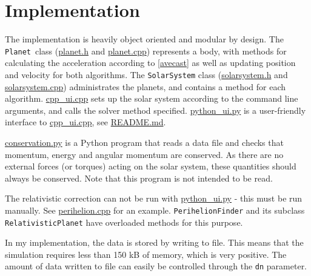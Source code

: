 \documentclass[12pt,english,a4paper]{article}
\newcommand{\program}[1]{\href{https://github.com/anjohan/Offentlig/blob/master/FYS3150/Oblig3/#1}{#1}}
\begin{document}
\section{Implementation}
The implementation is heavily object oriented and modular by design. The \texttt{Planet} class (\program{planet.h} and \program{planet.cpp}) represents a body, with methods for calculating the acceleration according to \ref{avecast} as well as updating position and velocity for both algorithms. The \texttt{SolarSystem} class (\program{solarsystem.h} and \program{solarsystem.cpp}) administrates the planets, and contains a method for each algorithm. \program{cpp\_ui.cpp} sets up the solar system according to the command line arguments, and calls the solver method specified. \program{python\_ui.py} is a user-friendly interface to \program{cpp\_ui.cpp}, see \program{README.md}.

\program{conservation.py} is a Python program that reads a data file and checks that momentum, energy and angular momentum are conserved. As there are no external forces (or torques) acting on the solar system, these quantities should always be conserved. Note that this program is not intended to be read.

The relativistic correction can not be run with \program{python\_ui.py} - this must be run manually. See \program{perihelion.cpp} for an example. \texttt{PerihelionFinder} and its subclass \texttt{RelativisticPlanet} have overloaded methods for this purpose.

In my implementation, the data is stored by writing to file. This means that the simulation requires less than 150 kB of memory, which is very positive. The amount of data written to file can easily be controlled through the \texttt{dn} parameter.
\end{document}
